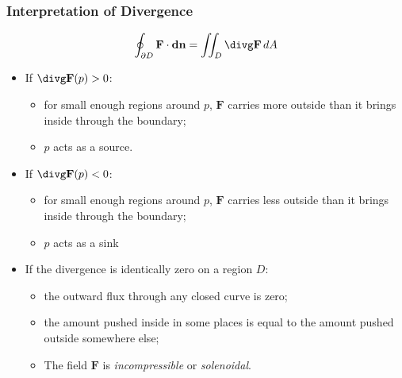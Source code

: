 \begin{frame}
  \frametitle{Interpretation of Divergence}

$$\oint_{\partial D} \textbf{F} \cdot \textbf{dn} = \iint_{D} \divg \textbf{F} \, dA$$

  \begin{itemize}
    \item If $\divg \textbf{F}(p)>0$:
    \begin{itemize}
      \item \pause for small enough regions around $p$, $\textbf{F}$ carries more outside than it brings inside through the boundary;
      \item \pause $p$ acts as a source.
    \end{itemize}
    \item If $\divg \textbf{F}(p)<0$:
    \begin{itemize}
      \item \pause for small enough regions around $p$, $\textbf{F}$ carries less outside than it brings inside through the boundary;
      \item \pause $p$ acts as a sink
    \end{itemize}
    \item If the divergence is identically zero on a region $D$:
    \begin{itemize}
      \item \pause the outward flux through any closed curve is zero;
      \item \pause the amount pushed inside in some places is equal to the amount pushed outside somewhere else;
      \item The field $\textbf{F}$ is \emph{incompressible} or \emph{solenoidal}.
    \end{itemize}
  \end{itemize}
\end{frame}

